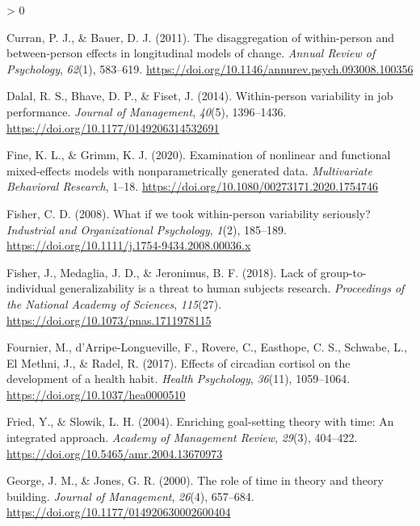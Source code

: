 \documentclass[
12pt, %
twoside,
english]{guelphthesis}
\newlength{\cslhangindent}
\newenvironment{CSLReferences}[2] %
 {%
  \setlength{\parindent}{0pt}
  \ifodd #1 \everypar{\setlength{\hangindent}{\cslhangindent}}\ignorespaces\fi
  \ifnum #2 > 0
  \setlength{\parskip}{\linespacing{2}}
  \fi
 }%
 {}
\begin{document}
\begin{CSLReferences}{1}{0}
\leavevmode{}%
Curran, P. J., \& Bauer, D. J. (2011). The disaggregation of within-person and between-person effects in longitudinal models of change. \emph{Annual Review of Psychology}, \emph{62}(1), 583--619. \url{https://doi.org/10.1146/annurev.psych.093008.100356}

\leavevmode{}%
Dalal, R. S., Bhave, D. P., \& Fiset, J. (2014). Within-person variability in job performance. \emph{Journal of Management}, \emph{40}(5), 1396--1436. \url{https://doi.org/10.1177/0149206314532691}

\leavevmode{}%
Fine, K. L., \& Grimm, K. J. (2020). Examination of nonlinear and functional mixed-effects models with nonparametrically generated data. \emph{Multivariate Behavioral Research}, 1--18. \url{https://doi.org/10.1080/00273171.2020.1754746}

\leavevmode{}%
Fisher, C. D. (2008). What if we took within-person variability seriously? \emph{Industrial and Organizational Psychology}, \emph{1}(2), 185--189. \url{https://doi.org/10.1111/j.1754-9434.2008.00036.x}

\leavevmode{}%
Fisher, J., Medaglia, J. D., \& Jeronimus, B. F. (2018). Lack of group-to-individual generalizability is a threat to human subjects research. \emph{Proceedings of the National Academy of Sciences}, \emph{115}(27). \url{https://doi.org/10.1073/pnas.1711978115}

\leavevmode{}%
Fournier, M., d'Arripe-Longueville, F., Rovere, C., Easthope, C. S., Schwabe, L., El Methni, J., \& Radel, R. (2017). Effects of circadian cortisol on the development of a health habit. \emph{Health Psychology}, \emph{36}(11), 1059--1064. \url{https://doi.org/10.1037/hea0000510}

\leavevmode{}%
Fried, Y., \& Slowik, L. H. (2004). Enriching goal-setting theory with time: An integrated approach. \emph{Academy of Management Review}, \emph{29}(3), 404--422. \url{https://doi.org/10.5465/amr.2004.13670973}

\leavevmode{}%
George, J. M., \& Jones, G. R. (2000). The role of time in theory and theory building. \emph{Journal of Management}, \emph{26}(4), 657--684. \url{https://doi.org/10.1177/014920630002600404}


\end{CSLReferences}
\end{document}
